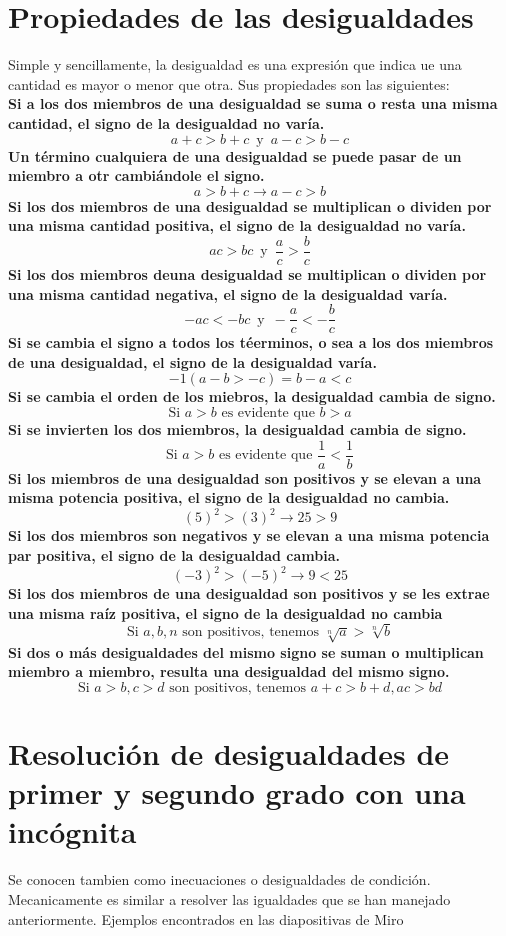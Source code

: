 \documentclass[letterpaper, 12pt]{article}
\begin{document}
        \section{Propiedades de las desigualdades}
        Simple y sencillamente, la desigualdad es una expresión que indica ue una cantidad es mayor o menor que otra. Sus propiedades son las siguientes:
        \\\newline
        \textbf{Si a los dos miembros de una desigualdad se suma o resta una misma cantidad, el signo de la desigualdad no varía.}
        \[a+c>b+c \,\text{ y }\, a-c>b-c\]
        \textbf{Un término cualquiera de una desigualdad se puede pasar de un miembro a otr cambiándole el signo.}
        \[a>b+c\rightarrow a-c>b\]
        \textbf{Si los dos miembros de una desigualdad se multiplican o dividen por una misma cantidad positiva, el signo de la desigualdad no varía.}
        \[ac>bc\, \text{ y }\,\frac{a}{c}>\frac{b}{c}\]
        \textbf{Si los dos miembros deuna desigualdad se multiplican o dividen por una misma cantidad negativa, el signo de la desigualdad varía.}
        \[-ac<-bc\, \text{ y }\,-\frac{a}{c}<-\frac{b}{c}\]
        \textbf{Si se cambia el signo a todos los téerminos, o sea a los dos miembros de una desigualdad, el signo de la desigualdad varía.}
        \[-1(a-b>-c)=b-a<c\]
        \textbf{Si se cambia el orden de los miebros, la desigualdad cambia de signo.}
        \[\text{Si }a>b \text{ es evidente que }b>a\]
        \textbf{Si se invierten los dos miembros, la desigualdad cambia de signo.}
        \[\text{Si }a>b \text{ es evidente que }\frac{1}{a}<\frac{1}{b}\]
        \textbf{Si los miembros de una desigualdad son positivos y se elevan a una misma potencia positiva, el signo de la desigualdad no cambia.}
        \[(5)^2>(3)^2\rightarrow 25>9\]
        \textbf{Si los dos miembros son negativos y se elevan a una misma potencia par positiva, el signo de la desigualdad cambia.}
        \[(-3)^2>(-5)^2\rightarrow 9<25\]
        \textbf{Si los dos miembros de una desigualdad son positivos y se les extrae una misma raíz positiva, el signo de la desigualdad no cambia }
        \[\text{Si }a,b,n \text{ son positivos, tenemos }\sqrt[n]{a}>\sqrt[n]{b}\]
        \textbf{Si dos o más desigualdades del mismo signo se suman o multiplican miembro a miembro, resulta una desigualdad del mismo signo.}
        \[\text{Si }a>b, c>d \text{ son positivos, tenemos }a+c>b+d, ac>bd\]
        \section{Resolución de desigualdades de primer y segundo grado con una incógnita}
        Se conocen tambien como inecuaciones o desigualdades de condición. Mecanicamente es similar a resolver las igualdades que se han manejado anteriormente. 
        Ejemplos encontrados en las diapositivas de Miro
\end{document}
